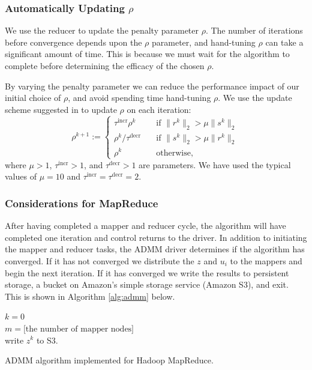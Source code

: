 \documentclass[10pt, conference, compsocconf]{IEEEtran}
\begin{document}
\subsubsection{Automatically Updating $\rho$}

We use the reducer to update the penalty parameter $\rho$.  The number of iterations before convergence depends upon the $\rho$ parameter, and hand-tuning $\rho$ can take a significant amount of time.  This is because we must wait for the algorithm to complete before determining the efficacy of the chosen $\rho$.

By varying the penalty parameter we can reduce the performance impact of our initial choice of $\rho$, and avoid spending time hand-tuning $\rho$.  We use the update scheme suggested in \cite{boyd} to update $\rho$ on each iteration:
\begin{equation}
\rho^{k+1}:=\begin{cases}
  \tau^{\text{incr}}\rho^k&\quad \text{if $\|r^k\|_2>\mu\|s^k\|_2$}\\
  \rho^k/\tau^{\text{decr}}&\quad \text{if $\|s^k\|_2>\mu\|r^k\|_2$}\\
  \rho^k&\quad \text{otherwise,}
\end{cases}
\label{eq:r}
\end{equation}
where $\mu>1$, $\tau^{\text{incr}}>1$, and $\tau^{\text{decr}}>1$ are parameters.  We have used the typical values of $\mu=10$ and $\tau^{\text{incr}}=\tau^{\text{decr}}=2$.

\subsubsection{Considerations for MapReduce}
After having completed a mapper and reducer cycle,  the algorithm will have completed one iteration and control returns to the driver.  In addition to initiating the mapper and reducer tasks, the ADMM driver determines if the algorithm has converged.  If it has not converged we distribute the $z$ and $u_i$ to the mappers and begin the next iteration.  If it has converged we write the results to persistent storage, a bucket on Amazon's simple storage service (Amazon S3), and exit.  This is shown in Algorithm \ref{alg:admm} below.

\begin{algorithm}
\SetAlgoLined
{}
$k=0$\\
$m=\text{[the number of mapper nodes]}$\\
write $z^k$ to S3.
\label{alg:admm}
\vspace{1em}
\caption{ADMM algorithm implemented for Hadoop MapReduce.}
\end{algorithm}
\end{document}
